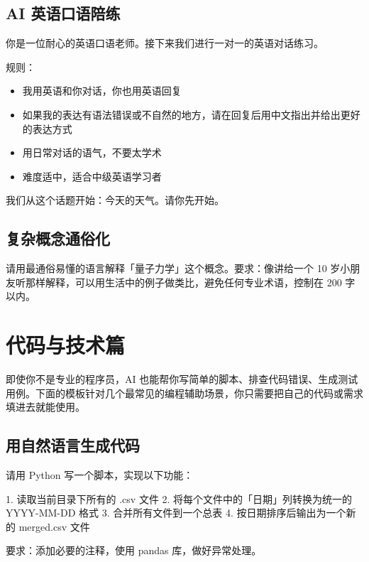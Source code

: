\subsection*{AI 英语口语陪练}

\begin{promptbox}
你是一位耐心的英语口语老师。接下来我们进行一对一的英语对话练习。

规则：
\begin{itemize}
  \item 我用英语和你对话，你也用英语回复
  \item 如果我的表达有语法错误或不自然的地方，请在回复后用中文指出并给出更好的表达方式
  \item 用日常对话的语气，不要太学术
  \item 难度适中，适合中级英语学习者
\end{itemize}

我们从这个话题开始：今天的天气。请你先开始。
\end{promptbox}

\subsection*{复杂概念通俗化}

\begin{promptbox}
请用最通俗易懂的语言解释「量子力学」这个概念。要求：像讲给一个 10 岁小朋友听那样解释，可以用生活中的例子做类比，避免任何专业术语，控制在 200 字以内。
\end{promptbox}

\section{代码与技术篇}

即使你不是专业的程序员，AI 也能帮你写简单的脚本、排查代码错误、生成测试用例。下面的模板针对几个最常见的编程辅助场景，你只需要把自己的代码或需求填进去就能使用。

\subsection*{用自然语言生成代码}

\begin{promptbox}
请用 Python 写一个脚本，实现以下功能：

1. 读取当前目录下所有的 .csv 文件
2. 将每个文件中的「日期」列转换为统一的 YYYY-MM-DD 格式
3. 合并所有文件到一个总表
4. 按日期排序后输出为一个新的 merged.csv 文件

要求：添加必要的注释，使用 pandas 库，做好异常处理。
\end{promptbox}

